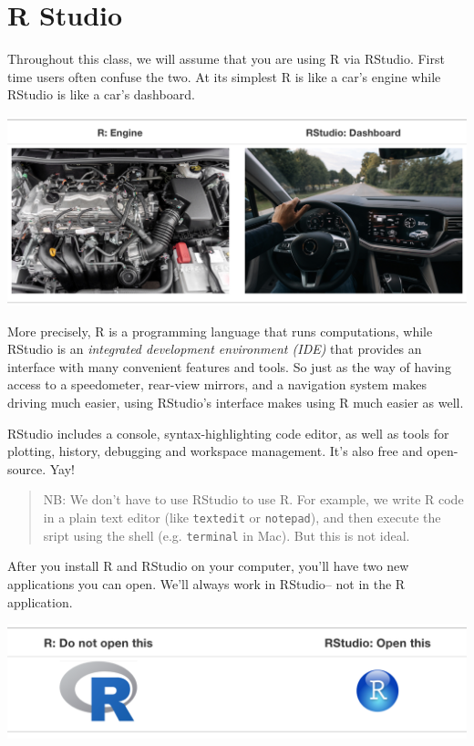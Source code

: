 \documentclass[]{book}
\begin{document}
\hypertarget{r-studio-1}{%
\section{R Studio}\label{r-studio-1}}

Throughout this class, we will assume that you are using R via RStudio. First time users often confuse the two. At its simplest R is like a car's engine while RStudio is like a car's dashboard.

\begin{center}\includegraphics[width=0.7\linewidth]{img/R_vs_RStudio_1} \end{center}

More precisely, R is a programming language that runs computations, while RStudio is an \emph{integrated development environment (IDE)} that provides an interface with many convenient features and tools. So just as the way of having access to a speedometer, rear-view mirrors, and a navigation system makes driving much easier, using RStudio's interface makes using R much easier as well.

RStudio includes a console, syntax-highlighting code editor, as well as tools for plotting, history, debugging and workspace management. It's also free and open-source. Yay!

\begin{quote}
NB: We don't have to use RStudio to use R. For example, we write R code in a plain text editor (like \texttt{textedit} or \texttt{notepad}), and then execute the sript using the shell (e.g. \texttt{terminal} in Mac). But this is not ideal.
\end{quote}

After you install R and RStudio on your computer, you'll have two new applications you can open. We'll always work in RStudio-- not in the R application.

\begin{center}\includegraphics[width=0.7\linewidth]{img/R_vs_RStudio} \end{center}
\end{document}
